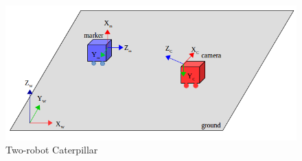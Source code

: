 \begin{figure}[H]
\centering
\includegraphics[scale=0.45]{./fig/marker_camera.png}
\caption{Two-robot Caterpillar}  
\label{fig:marker_camera}
\end{figure}

